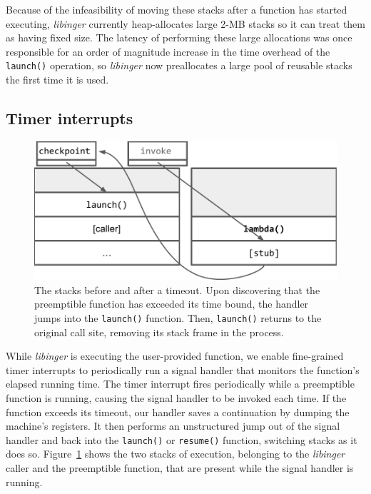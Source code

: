 Because of the infeasibility of moving these stacks after a function has started
executing, \textit{libinger} currently heap-allocates large 2-MB stacks so it can
treat them as having fixed size.  The latency of performing these large allocations
was once responsible for an order of magnitude increase in the time overhead of the
\texttt{launch()} operation, so \textit{libinger} now preallocates a large pool of
reusable stacks the first time it is used.


\subsection{Timer interrupts}

\begin{figure}
\includegraphics[width=\columnwidth]{figs/twostacks}
\caption{The stacks before and after a timeout.  \textnormal{Upon discovering
that the preemptible function has exceeded its time bound, the handler jumps into the
\texttt{launch()} function.  Then, \texttt{launch()} returns to the original call
site, removing its stack frame in the process.}}
\label{fig:twostacks}
\end{figure}

While \textit{libinger} is executing the user-provided function, we
enable fine-grained timer interrupts to periodically run a signal handler
that monitors the function's elapsed running time.  The timer interrupt fires
periodically while a preemptible function is running, causing the signal
handler to be invoked each time.  If the function exceeds its timeout,
our handler saves a continuation by dumping the machine's registers.  It then
performs an unstructured jump out of the signal handler and back into the
\texttt{launch()} or \texttt{resume()} function, switching stacks as it does so.
Figure~\ref{fig:twostacks} shows the two stacks of execution, belonging to the
\textit{libinger} caller and the preemptible function, that are present while the
signal handler is running.


